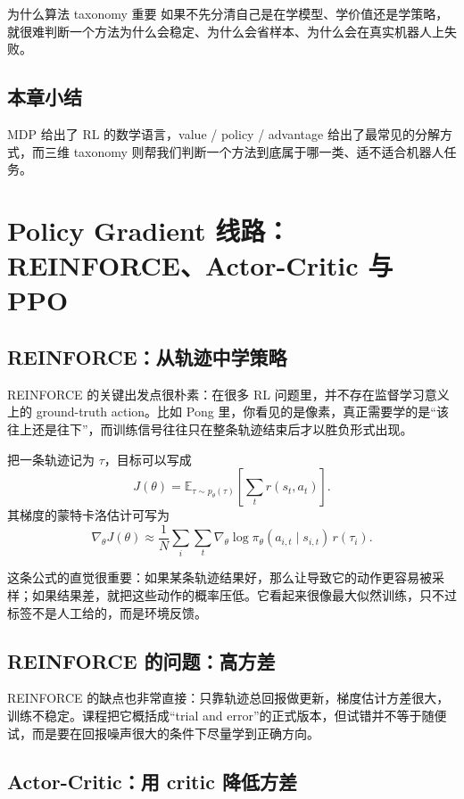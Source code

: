 \documentclass[a4paper]{article}
\begin{document}
\begin{warningbox}{为什么算法 taxonomy 重要}
如果不先分清自己是在学模型、学价值还是学策略，就很难判断一个方法为什么会稳定、为什么会省样本、为什么会在真实机器人上失败。
\end{warningbox}

\subsection{本章小结}

MDP 给出了 RL 的数学语言，value / policy / advantage 给出了最常见的分解方式，而三维 taxonomy 则帮我们判断一个方法到底属于哪一类、适不适合机器人任务。

\section{Policy Gradient 线路：REINFORCE、Actor-Critic 与 PPO}

\subsection{REINFORCE：从轨迹中学策略}

REINFORCE 的关键出发点很朴素：在很多 RL 问题里，并不存在监督学习意义上的 ground-truth action。比如 Pong 里，你看见的是像素，真正需要学的是“该往上还是往下”，而训练信号往往只在整条轨迹结束后才以胜负形式出现。

把一条轨迹记为 \(\tau\)，目标可以写成
\[
J(\theta)=\mathbb{E}_{\tau\sim p_\theta(\tau)}\!\left[\sum_t r(s_t,a_t)\right].
\]
其梯度的蒙特卡洛估计可写为
\[
\nabla_\theta J(\theta)\approx \frac{1}{N}\sum_i\sum_t \nabla_\theta \log \pi_\theta(a_{i,t}\mid s_{i,t})\, r(\tau_i).
\]

这条公式的直觉很重要：如果某条轨迹结果好，那么让导致它的动作更容易被采样；如果结果差，就把这些动作的概率压低。它看起来很像最大似然训练，只不过标签不是人工给的，而是环境反馈。

\subsection{REINFORCE 的问题：高方差}

REINFORCE 的缺点也非常直接：只靠轨迹总回报做更新，梯度估计方差很大，训练不稳定。课程把它概括成“trial and error”的正式版本，但试错并不等于随便试，而是要在回报噪声很大的条件下尽量学到正确方向。

\subsection{Actor-Critic：用 critic 降低方差}
\end{document}
